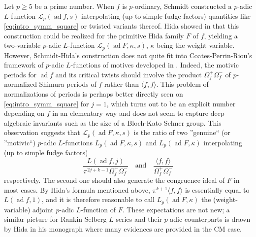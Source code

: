 \documentclass[12pt]{amsart}
\newcommand\cL{\mathcal{L}}
\DeclareMathOperator{\ad}{ad}
\theoremstyle{defstyle}
\theoremstyle{thmstyle}
\begin{document}
Let $p\geq 5$ be a prime number. When $f$ is $p$-ordinary, Schmidt \cite{schmidt} constructed a $p$-adic $L$-function $\cL_p(\ad f,s)$ interpolating (up to simple fudge factors) quantities like \eqref{eq:intro_symm_square} or twisted variants thereof. Hida showed in \cite{hidaGL3} that this construction could be realized for the primitive Hida family $F$ of $f$, yielding a two-variable $p$-adic $L$-function $\cL_p(\ad F,\kappa,s)$, $\kappa$ being the weight variable. 
However, Schmidt-Hida's construction does not quite fit into Coates-Perrin-Riou's framework of $p$-adic $L$-functions of motives developed in \cite{coatesperrinriou}. Indeed, the motivic periods for $\ad f$ and its critical twists should involve the product $\Omega_f^+\Omega_f^-$ of $p$-normalized Shimura periods of $f$ rather than $\langle f,f \rangle$. 
This problem of normalizations of periods is perhaps better directly seen on \eqref{eq:intro_symm_square} for $j=1$, which turns out to be an explicit number depending on $f$ in an elementary way and does not seem to capture deep algebraic invariants such as the size of a Bloch-Kato Selmer group.
This observation suggests that $\cL_p(\ad F,\kappa,s)$ is the ratio of two ''genuine`` (or ''motivic``) $p$-adic $L$-functions $L_p(\ad F,\kappa,s)$ and $L_p(\ad F,\kappa)$ interpolating (up to simple fudge factors)
	\begin{equation}\label{eq:intro_ratio_of_periods}
		\dfrac{L(\ad f,j)}{\pi^{2j+k-1}\Omega_f^+\Omega_f^-} \quad \mbox{and} \quad	\dfrac{\langle f,f\rangle}{\Omega_f^+\Omega_f^-}
	\end{equation}
respectively.
The second one should also generate the congruence ideal of $F$ in most cases. By Hida's formula mentioned above, $\pi^{k+1}\langle f,f\rangle$ is essentially equal to $L(\ad f,1)$, and it is therefore reasonable to call $L_p(\ad F,\kappa)$ the (weight-variable) adjoint $p$-adic $L$-function of $F$. 
These expectations are not new; a similar picture for Rankin-Selberg $L$-series and their $p$-adic counterparts is drawn by Hida in his monograph \cite{hidagenuine} where many evidences are provided in the CM case.
\end{document}
